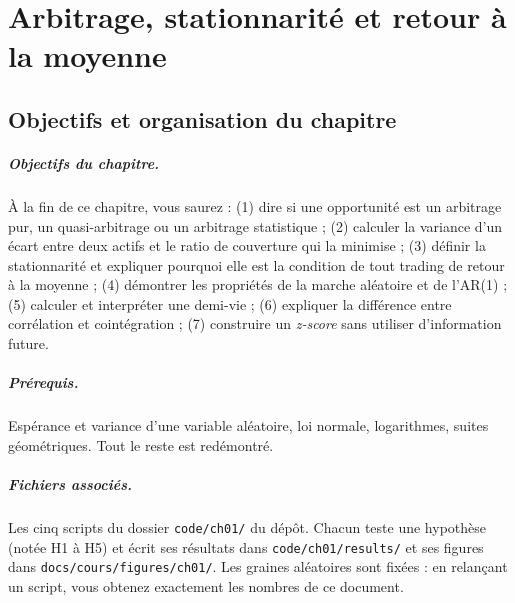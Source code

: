 \chapter{Arbitrage, stationnarité et retour à la moyenne}
\label{ch:1}


\section{Objectifs et organisation du chapitre}

\paragraph{Objectifs du chapitre.} À la fin de ce chapitre, vous saurez : (1) dire si une opportunité est un arbitrage pur, un quasi-arbitrage ou un arbitrage statistique ; (2) calculer la variance d'un écart entre deux actifs et le ratio de couverture qui la minimise ; (3) définir la stationnarité et expliquer pourquoi elle est la condition de tout trading de retour à la moyenne ; (4) démontrer les propriétés de la marche aléatoire et de l'AR(1) ; (5) calculer et interpréter une demi-vie ; (6) expliquer la différence entre corrélation et cointégration ; (7) construire un \emph{z-score} sans utiliser d'information future.

\paragraph{Prérequis.} Espérance et variance d'une variable aléatoire, loi normale, logarithmes, suites géométriques. Tout le reste est redémontré.

\paragraph{Fichiers associés.} Les cinq scripts du dossier \texttt{code/ch01/} du dépôt. Chacun teste une hypothèse (notée H1 à H5) et écrit ses résultats dans \texttt{code/ch01/results/} et ses figures dans \texttt{docs/cours/figures/ch01/}. Les graines aléatoires sont fixées : en relançant un script, vous obtenez exactement les nombres de ce document.


